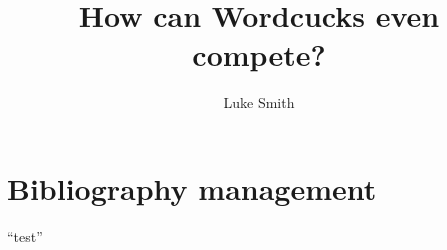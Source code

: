 \documentclass{article}
\author{Luke Smith}
\title{How can Wordcucks even compete?}
\begin{document}
\maketitle

\section{Bibliography management}

``test''

\printbibliography
\end{document}
